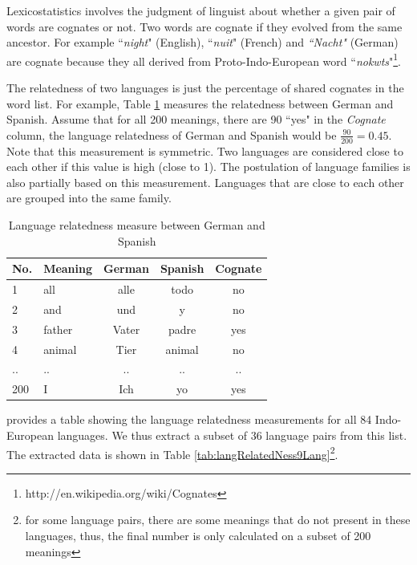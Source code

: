 Lexicostatistics involves the judgment of linguist about whether a given pair of words are cognates or not. Two words are cognate if they evolved from the same ancestor. For example ``\textit{night}" (English), ``\textit{nuit}" (French) and \textit{``Nacht"} (German) are cognate because they all derived from Proto-Indo-European word ``\textit{nokwts}"\footnote{http://en.wikipedia.org/wiki/Cognates}. 

The relatedness of two languages is just the percentage of shared cognates in the word list. For example, Table \ref{tab:langRelatednessMeasure} measures the relatedness  between German and Spanish. Assume that for all 200 meanings, there are 90 ``yes" in the \emph{Cognate} column, the language relatedness of German and Spanish would be $\frac{90}{200} = 0.45 $. Note that this measurement is symmetric. Two languages are considered close to each other if this value is high (close to 1). The postulation of language families is also partially based on this measurement. Languages that are close to each other are grouped into the same family. 

\begin{table}[htbp]
  \centering

    \begin{tabular}{llccc}
    No. & Meaning & German & Spanish & Cognate \\\hline
    1 & all   & alle  & todo  & no \\
    2 & and   & und   & y     & no \\
    3 & father & Vater & padre & yes \\
    4 & animal & Tier  & animal & no \\
    .. & .. & .. & .. & .. \\
    200 & I     & Ich   & yo    & yes \\

    \end{tabular}%
  \caption{Language relatedness measure between German and Spanish}
  \label{tab:langRelatednessMeasure}%
\end{table}%
 provides a table showing the language relatedness measurements for all 84 Indo-European languages. We thus extract a subset of 36 language pairs from this list. The extracted data is shown in Table \ref{tab:langRelatedNess9Lang}\footnote{for some language pairs, there are some meanings that do not present in these languages, thus, the final number is only calculated on a subset of 200 meanings}.


